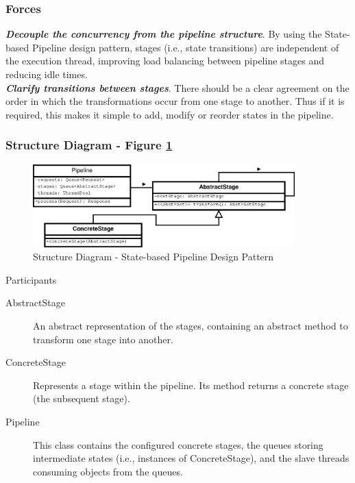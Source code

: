 \subsubsection{Forces}
\textbf{\textit{Decouple the concurrency from the pipeline structure}}. By using the State-based Pipeline design pattern, stages (i.e., state transitions) are independent of the execution thread, improving load balancing between pipeline stages and reducing idle times.\\

\noindent\textbf{\textit{Clarify transitions between stages}}. There should be a clear agreement on the order in which the transformations occur from one stage to another. Thus if it is required, this makes it simple to add, modify or reorder states in the pipeline.

\subsubsection{Structure Diagram - Figure \ref{fig:str_diagram_sbp}} 

\begin{figure}
	\centering
	\includegraphics*[width=0.9\textwidth, keepaspectratio=false]{fig/image6.eps}
	\caption{Structure Diagram - State-based Pipeline Design Pattern}
	\label{fig:str_diagram_sbp}
\end{figure}


\begin{description}
	\item[Participants]
\end{description}

\begin{description}
	\item[AbstractStage]
	An abstract representation of the stages, containing an abstract method to transform one stage into another.
	
	\item[ConcreteStage]
	Represents a stage within the pipeline. Its method returns a concrete stage (the subsequent stage).
	
	\item[Pipeline]
	This class contains the configured concrete stages, the queues storing intermediate states (i.e., instances of ConcreteStage), and the slave threads consuming objects from the queues.
	
\end{description}

